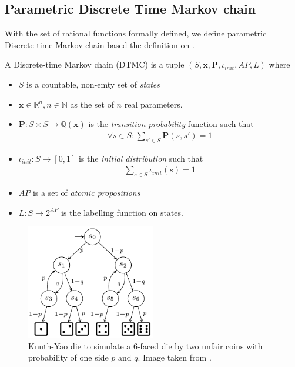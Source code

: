 \subsection{Parametric Discrete Time Markov chain}
With the set of rational functions formally defined, we define parametric Discrete-time Markov chain
based the definition on \cite{junges2019parameter}.
\begin{definition}
    A Discrete-time Markov chain (DTMC) is a tuple $(S, \mathbf{x}, \mathbf{P}, \iota_{init}, AP, L)$
    where
    \begin{itemize}
        \item $S$ is a countable, non-emty set of \textit{states}
        \item $\mathbf{x} \in \mathbb{R}^n, n \in \mathbb{N}$ as the set of $n$ real parameters.
        \item $\mathbf{P}:S\times S \rightarrow \mathbb{Q}(\mathbf{x})$ is the \textit{transition
                  probability} function such that
              \begin{align*}
                  \forall s \in S : \sum_{s'\in S}\mathbf{P}(s, s') = 1
              \end{align*}
        \item $\iota_{init}: S \rightarrow [0,1]$ is the \textit{initial distribution} such that
              \begin{align*}
                  \sum_{s\in S}\iota_{init}(s) = 1
              \end{align*}
        \item $AP$ is a set of \textit{atomic propositions}
        \item $L: S \rightarrow 2^{AP}$ is the labelling function on states.
    \end{itemize}
\end{definition}

\begin{example}
    \begin{figure}[H]
        \centering
        \includegraphics[width=0.5\textwidth]{figures/knuth_die_pq.png}
        \caption{Knuth-Yao die to simulate a 6-faced die by two unfair coins with probability of one
            side $p$ and $q$. Image taken from \cite{katoen2016probabilistic}.}
    \end{figure}
\end{example}

